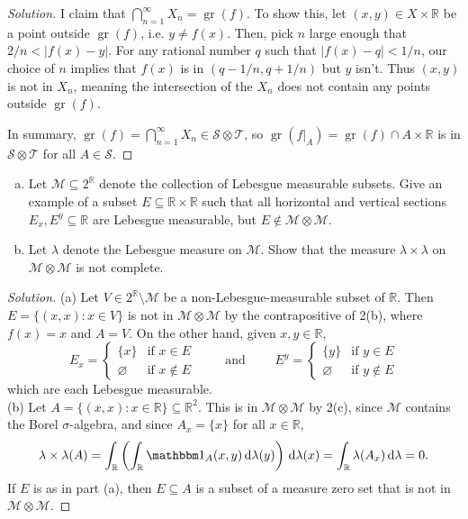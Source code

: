 \documentclass[10pt]{article}
\newcommand{\dd}{\,\mathrm{d}}
\providecommand{\RR}{\mathbb R}
\providecommand{\ind}{\mathbbm 1}
\providecommand{\ii}{\item}
\newenvironment{soln}{\begin{proof}[Solution]}{\end{proof}}
\providecommand{\abs}[1]{\left\lvert #1\right\rvert}
\providecommand{\gr}{\operatorname{gr}}
\begin{document}
\begin{soln}
    I claim that $\bigcap_{n=1}^\infty X_n = \gr(f)$.
    To show this, let $(x,y)\in X\times\RR$ be a point outside $\gr(f)$,
    i.e. $y\ne f(x)$. Then, pick $n$ large enough that
    $2/n < \abs{f(x) - y}$. For any rational number $q$ such that
    $\abs{f(x) - q} < 1/n$, our choice of $n$ implies that
    $f(x)$ is in $(q-1/n,q+1/n)$ but $y$ isn't.
    Thus $(x,y)$ is not in $X_n$, meaning the intersection of the $X_n$
    does not contain any points outside $\gr(f)$.

    In summary, $\gr(f) = \bigcap_{n=1}^\infty X_n\in\mathcal S\otimes\mathcal T$,
    so $\gr(f|_A) = \gr(f)\cap A\times\RR$ is in $\mathcal S\otimes \mathcal T$
    for all $A\in\mathcal S$.
\end{soln}

\pagebreak 
\begin{problem}
    \begin{enumerate}[(a)]
	\ii Let $\mathcal M\subseteq 2^\RR$ denote
	the collection of Lebesgue measurable subsets.
	Give an example of a subset $E\subseteq\RR\times\RR$ such that
	all horizontal and vertical sections $E_x,E^y\subseteq\RR$
	are Lebesgue measurable, but $E\notin\mathcal M\otimes\mathcal M$.
	\ii Let $\lambda$ denote the Lebesgue measure on $\mathcal M$.
	Show that the measure $\lambda\times\lambda$
	on $\mathcal M\otimes\mathcal M$ is not complete.
    \end{enumerate}
\end{problem}

\begin{soln}
    (a) Let $V\in 2^\RR\setminus\mathcal M$ be
    a non-Lebesgue-measurable subset of $\RR$.
    Then $E = \{(x,x) : x\in V\}$ is not in $\mathcal M\otimes\mathcal M$
    by the contrapositive of 2(b), where $f(x) = x$ and $A = V$.
    On the other hand, given $x,y\in\RR$,
    \begin{equation*}
        E_x = \begin{cases}
	    \{x\} & \text{if } x\in E\\
	    \varnothing & \text{if }x\notin E
	\end{cases}\qquad\text{ and }\qquad
        E^y = \begin{cases}
	    \{y\} & \text{if } y\in E\\
	    \varnothing & \text{if }y\notin E
        \end{cases}
    \end{equation*}
    which are each Lebesgue measurable.
    \\

    (b) Let $A = \{(x,x) : x\in\RR\}\subseteq\RR^2$.
    This is in $\mathcal M\otimes\mathcal M$ by 2(c),
    since $\mathcal M$ contains the Borel $\sigma$-algebra,
    and since $A_x = \{x\}$ for all $x\in\RR$,
    \begin{equation*}
        \lambda\times\lambda(A) =
	\int_\RR\left(\int_\RR \ind_A(x,y)\dd\lambda(y)\right)\dd\lambda(x)
	= \int_\RR \lambda(A_x)\dd\lambda = 0.
    \end{equation*}
    If $E$ is as in part (a), then $E\subseteq A$
    is a subset of a measure zero set that is not in $\mathcal M\otimes\mathcal M$.
\end{soln}
\end{document}
